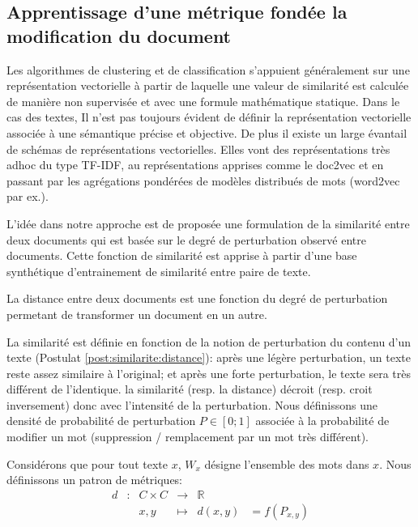 \subsection{Apprentissage d'une métrique fondée la modification du document}
Les algorithmes de clustering et de classification s'appuient généralement sur une représentation vectorielle à partir de laquelle une valeur de similarité est calculée de manière non supervisée et avec une formule mathématique statique. Dans le cas des textes, Il n'est pas toujours évident de définir la représentation vectorielle associée à une sémantique précise et objective. De plus il existe un large évantail de schémas de représentations vectorielles. Elles vont des représentations très adhoc du type TF-IDF, au représentations apprises comme le doc2vec et en passant par les agrégations pondérées de modèles distribués de mots (word2vec par ex.). 

L'idée dans notre approche est de proposée une formulation de la similarité entre deux documents qui est basée sur le degré de perturbation observé entre documents. Cette fonction de similarité est apprise à partir d'une base synthétique d'entrainement de similarité entre paire de texte. 
\begin{postulat}
La distance entre deux documents est une fonction du degré de perturbation permetant de transformer un document en un autre. \label{post:similarite:distance}
\end{postulat}
La similarité est définie en fonction de la notion de perturbation du contenu d'un texte (Postulat \ref{post:similarite:distance}): après une légère perturbation, un texte reste assez similaire à l'original; et après une forte perturbation, le texte sera très différent de l'identique. la similarité (resp. la distance) décroit (resp. croit inversement) donc avec l'intensité de la perturbation. Nous définissons une densité de probabilité de perturbation $P \in [0; 1]$ associée à la probabilité de modifier un mot (suppression / remplacement par un mot très différent). 

Considérons que pour tout texte $x$, $W_x$ désigne l'ensemble des mots dans $x$.
Nous définissons un patron de métriques:
\begin{equation}
\begin{array}{cccccc}
d & : & C \times C & \to & \mathbb{R} & \\
 & & x, y & \mapsto & d(x, y) & = f(P_{x,y}) \\
\end{array}
\end{equation}

